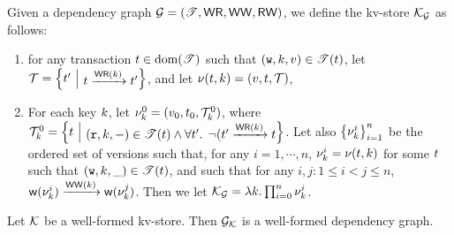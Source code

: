 \begin{definition}
\label{def:dependency-to-kv-store}
Given a dependency graph $\mathcal{G} = (\mathscr{T}, \mathsf{WR}, \mathsf{WW}, \mathsf{RW})$, we define the kv-store $\mathcal{K}_{\mathcal{G}}$ as follows: 
\begin{enumerate}
\item for any transaction $t \in \operatorname{dom}(\mathscr{T})$ such that $(\textnormal{\texttt w}, k, v) \in \mathscr{T}(t)$, 
    let $\txidset = \Set{ \txid' }[ \txid \toEDGE{\WR(\key)} \txid']$, and let $\nu(t, k) = (v, t, \mathcal{T})$, 
\item For each key $k$, let $\nu_{k}^{0} = (v_0, t_0, \mathcal{T}_k^{0})$, where $\txidset_{k}^{0} = \Set{ \txid }[ (\otR, \key, \stub) \in 
\TtoOp{T}(\txid) \land \fora{ \txid' } \neg( \txid' \toEDGE{\WR(\key)} \txid ]$. 
Let also $\Set{ \ver_{\key}^{i} }_{i = 1}^{n}$ be the ordered set of versions such that, for any 
$i=1,\cdots,n$, $\nu_{k}^{i} = \nu(t, k)$ for some $t$ such that $(\textnormal{\texttt w}, k, \_) \in \mathscr{T}(t)$, 
and such that for any $i, j: 1 \leq i < j \leq n$, $\wtOf(\ver_{\key}^{i}) \toEDGE{\WW(\key)} \wtOf(\ver_{\key}^{j})$. 
Then we let $\mathcal{K}_{\mathcal{G}}= \lambda k. \prod_{i=0}^{n} \nu_{k}^{i}$.
\end{enumerate}
\end{definition}

\begin{proposition}
\label{prop:well-formed-kv-store-to-dependency}
Let $\mathcal{K}$ be a well-formed kv-store. Then $\mathcal{G}_{\mathcal{K}}$ is a well-formed dependency graph.
\end{proposition}

